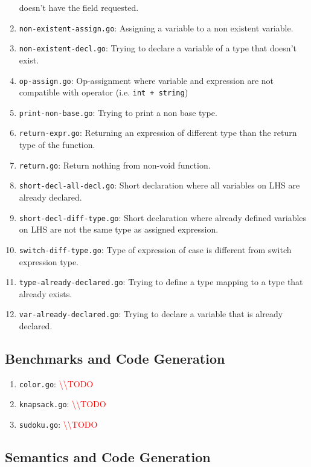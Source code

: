 \documentclass[11pt]{article}
\newcommand{\todo}[0]{\textcolor{red}{\textbackslash\textbackslash TODO \ }}
\begin{document}
\begin{enumerate}
  doesn't have the field requested.
\item \texttt{non-existent-assign.go}: Assigning a variable to a non
  existent variable.
\item \texttt{non-existent-decl.go}: Trying to declare a variable of
  a type that doesn't exist.
\item \texttt{op-assign.go}: Op-assignment where variable and
  expression are not compatible with operator (i.e. \texttt{int +
  string})
\item \texttt{print-non-base.go}: Trying to print a non base type.
\item \texttt{return-expr.go}: Returning an expression of different
  type than the return type of the function.
\item \texttt{return.go}: Return nothing from non-void function.
\item \texttt{short-decl-all-decl.go}: Short declaration where all
  variables on LHS are already declared.
\item \texttt{short-decl-diff-type.go}: Short declaration where
  already defined variables on LHS are not the same type as assigned
  expression.
\item \texttt{switch-diff-type.go}: Type of expression of case is
  different from switch expression type.
\item \texttt{type-already-declared.go}: Trying to define a type
  mapping to a type that already exists.
\item \texttt{var-already-declared.go}: Trying to declare a variable
  that is already declared.
\end{enumerate}

\subsection*{Benchmarks and Code Generation}

\begin{enumerate}
\item \texttt{color.go}: \todo%
\item \texttt{knapsack.go}: \todo%
\item \texttt{sudoku.go}: \todo%
\end{enumerate}

\subsection*{Semantics and Code Generation}
\end{document}
